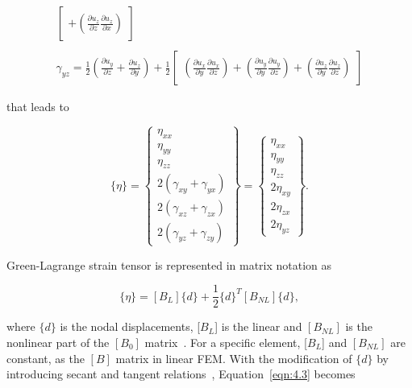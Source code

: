 \begin{equation}
\begin{array}{l}
\begin{bmatrix}
+
{\left(\frac{\partial{u_{z}}}{\partial{z}}\frac{\partial{u_{z}}}{\partial{x}}\right)}
\end{bmatrix}\\ \; \\
\gamma_{yz} = \frac{1}{2}{\left(\frac{\partial{u_{y}}}{\partial{z}} + \frac{\partial{u_{z}}}{\partial{y}}\right)}
+
\frac{1}{2}
\begin{bmatrix}
{\left(\frac{\partial{u_{x}}}{\partial{y}}\frac{\partial{u_{x}}}{\partial{z}}\right)}
+
{\left(\frac{\partial{u_{y}}}{\partial{y}}\frac{\partial{u_{y}}}{\partial{z}}\right)}
+
{\left(\frac{\partial{u_{z}}}{\partial{y}}\frac{\partial{u_{z}}}{\partial{z}}\right)}
\end{bmatrix}
\end{array}
\end{equation}

\noindent that leads to

\begin{equation}
\{\eta\} =
\begin{Bmatrix}
\eta_{xx} \\
\eta_{yy} \\
\eta_{zz} \\
2\left(\gamma_{xy} + \gamma_{yx}\right) \\
2\left(\gamma_{xz} + \gamma_{zx}\right) \\
2\left(\gamma_{yz} + \gamma_{zy}\right)
\end{Bmatrix}
=
\begin{Bmatrix}
\eta_{xx} \\
\eta_{yy} \\
\eta_{zz} \\
2\eta_{xy} \\
2\eta_{zx} \\
2\eta_{yz}
\end{Bmatrix}.
\label{eqn:4.2}
\end{equation}



\noindent Green-Lagrange strain tensor is represented in matrix notation as

\begin{equation}
\{\eta\} = [B_{L}] \{d\} + \frac{1}{2}\{d\}^T[B_{NL}]\{d\},
\label{eqn:4.3}
\end{equation}

\noindent where $\{d\}$ is the nodal displacements, [$B_{L}$] is the linear and $[B_{NL}]$ is the nonlinear part of the $[B_{0}]$ matrix~\cite{Pedersen06}. For a specific element, [$B_{L}$] and $[B_{NL}]$ are constant, as the $[B]$ matrix in linear FEM. With the modification of $\{d\}$ by introducing secant and tangent relations~\cite{Pedersen08}, Equation~\ref{eqn:4.3} becomes

